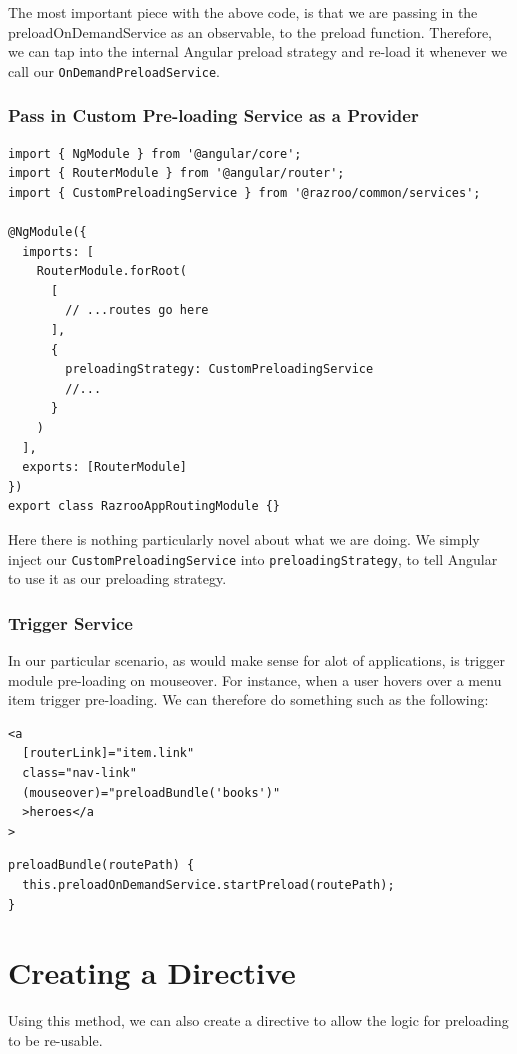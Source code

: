 The most important piece with the above code, is that we are passing in 
the preloadOnDemandService as an observable, to the preload function. 
Therefore, we can tap into the internal Angular preload strategy and 
re-load it whenever we call our \lstinline{OnDemandPreloadService}.

\subsubsection{Pass in Custom Pre-loading Service as a Provider}
\begin{lstlisting}[caption=app.routing.module.ts]
import { NgModule } from '@angular/core';
import { RouterModule } from '@angular/router';
import { CustomPreloadingService } from '@razroo/common/services';

@NgModule({
  imports: [
    RouterModule.forRoot(
      [
        // ...routes go here
      ],
      {
        preloadingStrategy: CustomPreloadingService
        //...
      }
    )
  ],
  exports: [RouterModule]
})
export class RazrooAppRoutingModule {}
\end{lstlisting}

Here there is nothing particularly novel about what we are doing. 
We simply inject our \lstinline{CustomPreloadingService} into 
\lstinline{preloadingStrategy}, to tell Angular to use it as our 
preloading strategy. 

\subsubsection{Trigger Service}
In our particular scenario, as would make sense for alot of applications, is trigger 
module pre-loading on mouseover. For instance, when a user hovers over a menu item 
trigger pre-loading. We can therefore do something such as the following: 
\begin{lstlisting}
<a
  [routerLink]="item.link"
  class="nav-link"
  (mouseover)="preloadBundle('books')"
  >heroes</a
>  
\end{lstlisting}

\begin{lstlisting}
preloadBundle(routePath) {
  this.preloadOnDemandService.startPreload(routePath);
}
\end{lstlisting}

\section{Creating a Directive}
Using this method, we can also create a directive to allow the logic for 
preloading to be re-usable. 

